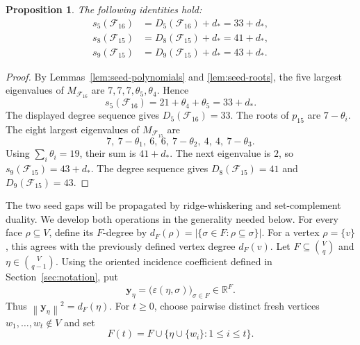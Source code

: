 \documentclass[11pt]{article}
\newtheorem{proposition}[theorem]{Proposition}
\newcommand{\R}{\mathbb{R}}
\newcommand{\norm}[1]{\left\lVert #1\right\rVert}
\newcommand{\calF}{\mathcal{F}}
\begin{document}
	\begin{proposition}\label{prop:seed-defects}
		The following identities hold:
		\begin{align*}
			s_5(\calF_{16})&=D_5(\calF_{16})+d_*=33+d_*,\\
			s_8(\calF_{15})&=D_8(\calF_{15})+d_*=41+d_*,\\
			s_9(\calF_{15})&=D_9(\calF_{15})+d_*=43+d_*.
		\end{align*}
	\end{proposition}
	
	\begin{proof}
		By Lemmas~\ref{lem:seed-polynomials} and \ref{lem:seed-roots}, the five
		largest eigenvalues of \(M_{\calF_{16}}\) are
		\(7,7,7,\theta_5,\theta_4\).  Hence
		\[
		s_5(\calF_{16})=21+\theta_4+\theta_5=33+d_*.
		\]
		The displayed degree sequence gives \(D_5(\calF_{16})=33\).
		The roots of \(p_{15}\) are \(7-\theta_i\).  The eight largest
		eigenvalues of \(M_{\calF_{15}}\) are
		\[
		7,\ 7-\theta_1,\ 6,\ 6,\ 7-\theta_2,\ 4,\ 4,\ 7-\theta_3.
		\]
		Using \(\sum_i\theta_i=19\), their sum is \(41+d_*\).  The next
		eigenvalue is \(2\), so \(s_9(\calF_{15})=43+d_*\).  The degree
		sequence gives \(D_8(\calF_{15})=41\) and \(D_9(\calF_{15})=43\).
	\end{proof}
	

	The two seed gaps will be propagated by ridge-whiskering and set-complement
	duality.  We develop both operations in the generality needed below.
For every face \(\rho\subseteq V\), define its \(F\)-degree by
$d_F(\rho)=|\{\sigma\in F:\rho\subseteq\sigma\}|.$
For a vertex \(\rho=\{v\}\), this agrees with the previously defined
vertex degree \(d_F(v)\).
Let \(F\subseteq\binom Vq\) and \(\eta\in\binom V{q-1}\).  Using the
	oriented incidence coefficient defined in Section~\ref{sec:notation}, put
	\[
	\mathbf y_\eta
	=\bigl(\varepsilon(\eta,\sigma)\bigr)_{\sigma\in F}
	\in\R^F.
	\]
	Thus \(\norm{\mathbf y_\eta}^2=d_F(\eta)\).  For \(t\ge0\), choose pairwise
	distinct fresh vertices \(w_1,\ldots,w_t\notin V\) and set
	\[
	F(t)=F\cup\{\eta\cup\{w_i\}:1\le i\le t\}.
	\]
	
\end{document}

